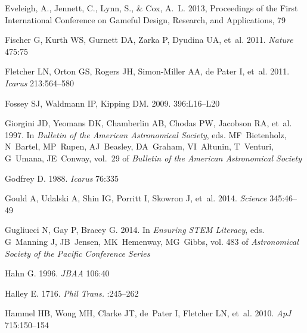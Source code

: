 \documentclass{ar2e}
\begin{document}
\begin{thebibliography}{}
{Eveleigh}, A., {Jennett}, C., {Lynn}, S., \& {Cox}, A.~L. 2013, {Proceedings
  of the First International Conference on Gameful Design, Research, and
  Applications}, 79

{Fischer} G, {Kurth} WS, {Gurnett} DA, {Zarka} P, {Dyudina} UA, et~al. 2011.
\newblock \textit{{Nature}} 475:75

{Fletcher} LN, {Orton} GS, {Rogers} JH, {Simon-Miller} AA, {de Pater} I, et~al.
  2011.
\newblock \textit{Icarus} 213:564--580

{Fossey} SJ, {Waldmann} IP, {Kipping} DM. 2009.
\newblock \textit{\mnras} 396:L16--L20

{Giorgini} JD, {Yeomans} DK, {Chamberlin} AB, {Chodas} PW, {Jacobson} RA,
  et~al. 1997.
\newblock In \textit{Bulletin of the American Astronomical Society}, eds.
  MF~{Bietenholz}, N~{Bartel}, MP~{Rupen}, AJ~{Beasley}, DA~{Graham},
  VI~{Altunin}, T~{Venturi}, G~{Umana}, JE~{Conway}, vol.~29 of
  \textit{Bulletin of the American Astronomical Society}

{Godfrey} D. 1988.
\newblock \textit{{Icarus}} 76:335

{Gould} A, {Udalski} A, {Shin} IG, {Porritt} I, {Skowron} J, et~al. 2014.
\newblock \textit{Science} 345:46--49

{Gugliucci} N, {Gay} P, {Bracey} G. 2014.
\newblock In \textit{Ensuring STEM Literacy}, eds. G~{Manning} J, JB~{Jensen},
  MK~{Hemenway}, MG~{Gibbs}, vol. 483 of \textit{Astronomical Society of the
  Pacific Conference Series}

{Hahn} G. 1996.
\newblock \textit{{JBAA}} 106:40

{Halley} E. 1716.
\newblock \textit{Phil Trans.} :245--262

Hammel HB, Wong MH, Clarke JT, de~Pater I, Fletcher LN, et~al. 2010.
\newblock \textit{ApJ} 715:150--154


\end{thebibliography}
\end{document}
